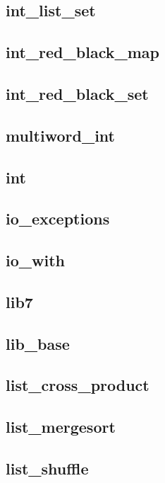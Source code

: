 \subsection{int\_list\_set}					
\subsection{int\_red\_black\_map}				
\subsection{int\_red\_black\_set}				
\subsection{multiword\_int}					
\subsection{int}						
\subsection{io\_exceptions}					
\subsection{io\_with}						
\subsection{lib7}						
\subsection{lib\_base}						
\subsection{list\_cross\_product}				
\subsection{list\_mergesort}					
\subsection{list\_shuffle}					
